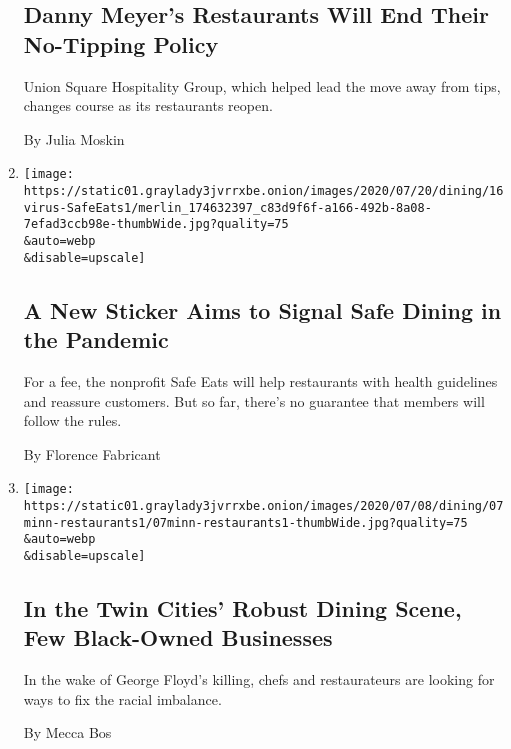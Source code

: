 \begin{enumerate}
  \hypertarget{danny-meyers-restaurants-will-end-their-no-tipping-policy}{%
  \subsection{Danny Meyer's Restaurants Will End Their No-Tipping
  Policy}\label{danny-meyers-restaurants-will-end-their-no-tipping-policy}}

  Union Square Hospitality Group, which helped lead the move away from
  tips, changes course as its restaurants reopen.

  By Julia Moskin
\item
  \href{/2020/07/17/dining/safe-eats-sticker-restaurants-coronavirus.html}{}

  \texttt{[image: https://static01.graylady3jvrrxbe.onion/images/2020/07/20/dining/16virus-SafeEats1/merlin\_174632397\_c83d9f6f-a166-492b-8a08-7efad3ccb98e-thumbWide.jpg?quality=75\\\&auto=webp\\\&disable=upscale]}

  \hypertarget{a-new-sticker-aims-to-signal-safe-dining-in-the-pandemic}{%
  \subsection{A New Sticker Aims to Signal Safe Dining in the
  Pandemic}\label{a-new-sticker-aims-to-signal-safe-dining-in-the-pandemic}}

  For a fee, the nonprofit Safe Eats will help restaurants with health
  guidelines and reassure customers. But so far, there's no guarantee
  that members will follow the rules.

  By Florence Fabricant
\item
  \href{/2020/07/07/dining/twin-cities-restaurants-racial-injustice.html}{}

  \texttt{[image: https://static01.graylady3jvrrxbe.onion/images/2020/07/08/dining/07minn-restaurants1/07minn-restaurants1-thumbWide.jpg?quality=75\\\&auto=webp\\\&disable=upscale]}

  \hypertarget{in-the-twin-cities-robust-dining-scene-few-black-owned-businesses}{%
  \subsection{In the Twin Cities' Robust Dining Scene, Few Black-Owned
  Businesses}\label{in-the-twin-cities-robust-dining-scene-few-black-owned-businesses}}

  In the wake of George Floyd's killing, chefs and restaurateurs are
  looking for ways to fix the racial imbalance.

  By Mecca Bos
\end{enumerate}

